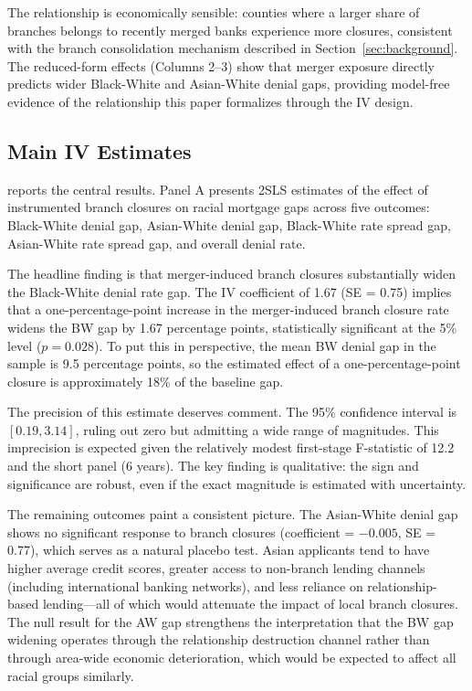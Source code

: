 \documentclass[12pt]{article}
\begin{document}
The relationship is economically sensible: counties where a larger share of branches belongs to recently merged banks experience more closures, consistent with the branch consolidation mechanism described in Section~\ref{sec:background}. The reduced-form effects (Columns 2--3) show that merger exposure directly predicts wider Black-White and Asian-White denial gaps, providing model-free evidence of the relationship this paper formalizes through the IV design.



\subsection{Main IV Estimates}

 reports the central results. Panel A presents 2SLS estimates of the effect of instrumented branch closures on racial mortgage gaps across five outcomes: Black-White denial gap, Asian-White denial gap, Black-White rate spread gap, Asian-White rate spread gap, and overall denial rate.

The headline finding is that merger-induced branch closures substantially widen the Black-White denial rate gap. The IV coefficient of 1.67 (SE = 0.75) implies that a one-percentage-point increase in the merger-induced branch closure rate widens the BW gap by 1.67 percentage points, statistically significant at the 5\% level ($p = 0.028$). To put this in perspective, the mean BW denial gap in the sample is 9.5 percentage points, so the estimated effect of a one-percentage-point closure is approximately 18\% of the baseline gap.

The precision of this estimate deserves comment. The 95\% confidence interval is $[0.19, 3.14]$, ruling out zero but admitting a wide range of magnitudes. This imprecision is expected given the relatively modest first-stage F-statistic of 12.2 and the short panel (6 years). The key finding is qualitative: the sign and significance are robust, even if the exact magnitude is estimated with uncertainty.

The remaining outcomes paint a consistent picture. The Asian-White denial gap shows no significant response to branch closures (coefficient = $-0.005$, SE = 0.77), which serves as a natural placebo test. Asian applicants tend to have higher average credit scores, greater access to non-branch lending channels (including international banking networks), and less reliance on relationship-based lending---all of which would attenuate the impact of local branch closures. The null result for the AW gap strengthens the interpretation that the BW gap widening operates through the relationship destruction channel rather than through area-wide economic deterioration, which would be expected to affect all racial groups similarly.
\end{document}
